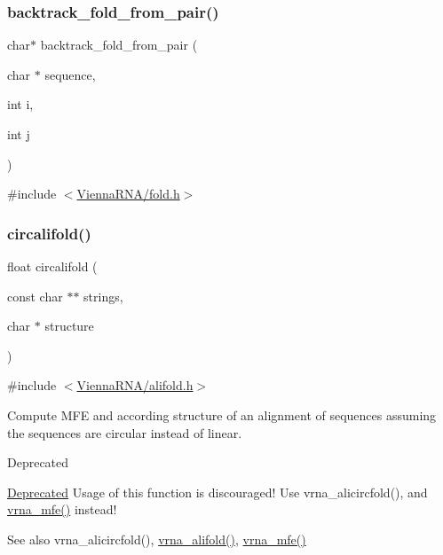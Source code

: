 \subsubsection{\texorpdfstring{backtrack\_fold\_from\_pair()}{backtrack\_fold\_from\_pair()}}
{\footnotesize\ttfamily char$\ast$ backtrack\+\_\+fold\+\_\+from\+\_\+pair (\begin{DoxyParamCaption}\item[{char $\ast$}]{sequence,  }\item[{int}]{i,  }\item[{int}]{j }\end{DoxyParamCaption})}



{\ttfamily \#include $<$\mbox{\hyperlink{fold_8h}{Vienna\+R\+N\+A/fold.\+h}}$>$}

\mbox{\label{group__mfe__global__deprecated_gadbd3b0b1c144cbfb4efe704b2b260f96}} 
\subsubsection{\texorpdfstring{circalifold()}{circalifold()}}
{\footnotesize\ttfamily float circalifold (\begin{DoxyParamCaption}\item[{const char $\ast$$\ast$}]{strings,  }\item[{char $\ast$}]{structure }\end{DoxyParamCaption})}



{\ttfamily \#include $<$\mbox{\hyperlink{alifold_8h}{Vienna\+R\+N\+A/alifold.\+h}}$>$}



Compute M\+FE and according structure of an alignment of sequences assuming the sequences are circular instead of linear. 

\begin{DoxyRefDesc}{Deprecated}
\item[\mbox{\hyperlink{deprecated__deprecated000013}{Deprecated}}]Usage of this function is discouraged! Use vrna\+\_\+alicircfold(), and \mbox{\hyperlink{group__mfe__global_gabd3b147371ccf25c577f88bbbaf159fd}{vrna\+\_\+mfe()}} instead! \end{DoxyRefDesc}
\begin{DoxySeeAlso}{See also}
vrna\+\_\+alicircfold(), \mbox{\hyperlink{group__mfe__global_ga6c9d3bef3e92c6d423ffac9f981418c1}{vrna\+\_\+alifold()}}, \mbox{\hyperlink{group__mfe__global_gabd3b147371ccf25c577f88bbbaf159fd}{vrna\+\_\+mfe()}}
\end{DoxySeeAlso}

